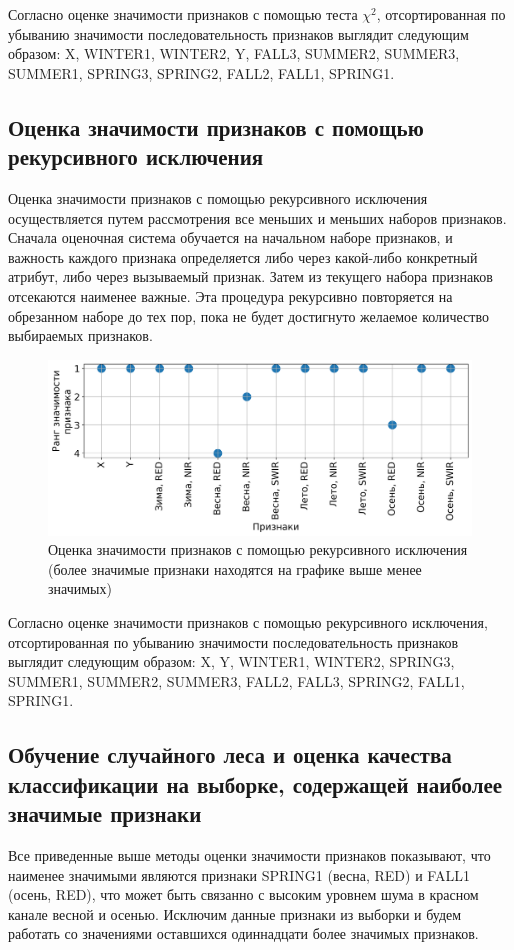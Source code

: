\documentclass[14pt, a4paper, oneside]{extarticle}
\begin{document}
Согласно оценке значимости признаков с помощью теста $\chi^2$, отсортированная по убыванию значимости последовательность признаков выглядит следующим образом: X, WINTER1, WINTER2, Y, FALL3, SUMMER2, SUMMER3, SUMMER1, SPRING3, SPRING2, FALL2, FALL1, SPRING1.

\subsection{Оценка значимости признаков с помощью рекурсивного исключения}

Оценка значимости признаков с помощью рекурсивного исключения осуществляется путем рассмотрения все меньших и меньших наборов признаков. Сначала оценочная система обучается на начальном наборе признаков, и важность каждого признака определяется либо через какой-либо конкретный атрибут, либо через вызываемый признак. Затем из текущего набора признаков отсекаются наименее важные. Эта процедура рекурсивно повторяется на обрезанном наборе до тех пор, пока не будет достигнуто желаемое количество выбираемых признаков.

\begin{figure}[H]
    \caption{Оценка значимости признаков с помощью рекурсивного исключения (более значимые признаки находятся на графике выше менее значимых)}
    \centering
    \includegraphics[scale=0.6]{rfe-selector-feature-ranking}
\end{figure}
\newpage

Согласно оценке значимости признаков с помощью рекурсивного исключения, отсортированная по убыванию значимости последовательность признаков выглядит следующим образом: X, Y, WINTER1, WINTER2, SPRING3, SUMMER1, SUMMER2, SUMMER3, FALL2, FALL3, SPRING2, FALL1, SPRING1.

\subsection{Обучение случайного леса и оценка качества классификации на выборке, содержащей наиболее значимые признаки}
Все приведенные выше методы оценки значимости признаков показывают, что наименее значимыми являются признаки SPRING1 (весна, RED) и FALL1 (осень, RED), что может быть связанно с высоким уровнем шума в красном канале весной и осенью. Исключим данные признаки из выборки и будем работать со значениями оставшихся одиннадцати более значимых признаков.
\end{document}
